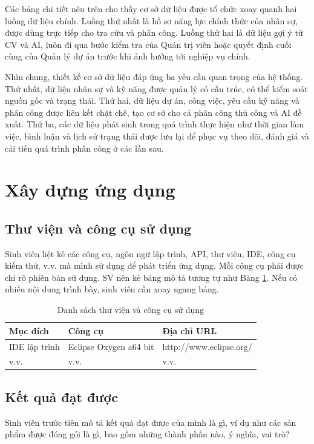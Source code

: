\documentclass[../DoAn.tex]{subfiles}
\begin{document}
Các bảng chi tiết nêu trên cho thấy cơ sở dữ liệu được tổ chức xoay quanh hai luồng dữ liệu chính. Luồng thứ nhất là hồ sơ năng lực chính thức của nhân sự, được dùng trực tiếp cho tra cứu và phân công. Luồng thứ hai là dữ liệu gợi ý từ CV và AI, luôn đi qua bước kiểm tra của Quản trị viên hoặc quyết định cuối cùng của Quản lý dự án trước khi ảnh hưởng tới nghiệp vụ chính.

Nhìn chung, thiết kế cơ sở dữ liệu đáp ứng ba yêu cầu quan trọng của hệ thống. Thứ nhất, dữ liệu nhân sự và kỹ năng được quản lý có cấu trúc, có thể kiểm soát nguồn gốc và trạng thái. Thứ hai, dữ liệu dự án, công việc, yêu cầu kỹ năng và phân công được liên kết chặt chẽ, tạo cơ sở cho cả phân công thủ công và AI đề xuất. Thứ ba, các dữ liệu phát sinh trong quá trình thực hiện như thời gian làm việc, bình luận và lịch sử trạng thái được lưu lại để phục vụ theo dõi, đánh giá và cải tiến quá trình phân công ở các lần sau.

\section{Xây dựng ứng dụng}
\subsection{Thư viện và công cụ sử dụng}
Sinh viên liệt kê các công cụ, ngôn ngữ lập trình, API, thư viện, IDE, công cụ kiểm thử, v.v. mà mình sử dụng để phát triển ứng dụng. Mỗi công cụ phải được chỉ rõ phiên bản sử dụng. SV nên kẻ bảng mô tả tương tự như Bảng \ref{table:my_label}. Nếu có nhiều nội dung trình bày, sinh viên cần xoay ngang bảng.

\begin{table}[H]
\centering{}
    \begin{tabular}{lll}
        \hline
        \textbf{Mục đích} & \textbf{Công cụ}       & \textbf{Địa chỉ URL}    \\ \hline
        IDE lập trình     & Eclipse Oxygen a64 bit & http://www.eclipse.org/ \\ \hline
        v.v.              & v.v.                   & v.v.                    \\ \hline
        \end{tabular}
    \caption{Danh sách thư viện và công cụ sử dụng}
    \label{table:my_label}
\end{table}

\subsection{Kết quả đạt được}
Sinh viên trước tiên mô tả kết quả đạt được của mình là gì, ví dụ như các sản phẩm được đóng gói là gì, bao gồm những thành phần nào, ý nghĩa, vai trò?
\end{document}
